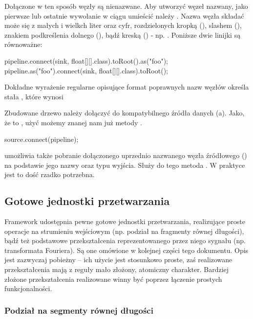 Dołączone w ten sposób węzły są nienazwane. Aby utworzyć węzeł nazwany, jako pierwsze lub ostatnie
wywołanie w ciągu umieścić należy . Nazwa węzła składać może się z małych i wielkch
liter oraz cyfr, rozdzielonych kropką (), slashem (\code{/}), znakiem podkreślenia dolnego
(\code{\_}), bądź kreską (\code{-}) - np. .  Poniższe dwie linijki są
równoważne:

\begin{java}
pipeline.connect(sink, float[][].class).toRoot().as("foo");
pipeline.as("foo").connect(sink, float[][].class).toRoot();
\end{java}

\begin{Note}
Dokładne wyrażenie regularne opisujące format poprawnych nazw węzłów określa stała
, które wynosi \\ \code{[a-zA-Z0-9]\}([\_./-][a-zA-Z0-9])*}
\end{Note}

Zbudowane drzewo należy dołączyć do kompatybilnego źródła danych (a). Jako, że
 to , użyć możemy znanej nam już metody .

\begin{java}
source.connect(pipeline);
\end{java}

 umożliwia także pobranie dołączonego uprzednio nazwanego węzła źródłowego
() na podstawie jego nazwy oraz typu wyjścia. Służy do tego metoda
. W praktyce jest to dość rzadko potrzebna.


\subsection{Gotowe jednostki przetwarzania}

Framework udostępnia pewne gotowe jednostki przetwarzania, realizujące proste operacje na strumieniu
wejściowym (np. podział na fragmenty równej długości), bądź też podstawowe przekształcenia
reprezentowanego przez niego sygnału (np. transformata Fouriera). Są one omówione w kolejnej części
tego dokumentu. Opis jest zazwyczaj pobieżny -- ich użycie jest stosunkowo proste, zaś realizowane
przekształcenia mają z reguły mało złożony, atomiczny charakter. Bardziej złożone przekształcenia
realizowane winny być poprzez łączenie prostych funkcjonalności.


\subsubsection{Podział na segmenty równej długości}

